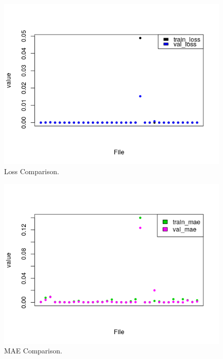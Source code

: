 \documentclass[%
aip,
amsmath,amssymb,
reprint,%
]{revtex4-1}
\begin{document}
\begin{figure}[h!]
	\includegraphics[width=\linewidth]{loss.png}
	\caption{Loss Comparison.}
	\label{fig:loss}
\end{figure}

\begin{figure}[h!]
	\includegraphics[width=\linewidth]{mae.png}
	\caption{MAE Comparison.}
	\label{fig:mae}
\end{figure}
\end{document}
